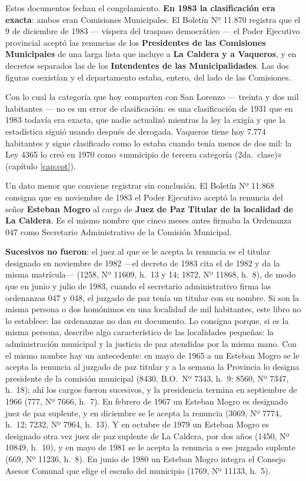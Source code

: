 Estos documentos fechan el congelamiento. \textbf{En 1983 la clasificación era exacta}: ambos eran Comisiones Municipales. El Boletín Nº 11.870 registra que el 9 de diciembre de 1983 --- víspera del traspaso democrático --- el Poder Ejecutivo provincial aceptó las renuncias de los \textbf{Presidentes de las Comisiones Municipales} de una larga lista que incluye a \textbf{La Caldera y a Vaqueros}, y en decretos separados las de los \textbf{Intendentes de las Municipalidades}. Las dos figuras coexistían y el departamento estaba, entero, del lado de las Comisiones.

Con lo cual la categoría que hoy comparten con San Lorenzo --- treinta y dos mil habitantes --- no es un error de clasificación: es una clasificación de 1931 que en 1983 todavía era exacta, que nadie actualizó mientras la ley la exigía y que la estadística siguió usando después de derogada. Vaqueros tiene hoy 7.774 habitantes y sigue clasificado como lo estaba cuando tenía menos de dos mil: la Ley 4365 lo creó en 1970 como «municipio de tercera categoría (2da.\ clase)» (capítulo \ref{cap:cot}).

\begin{cautela}
Un dato menor que conviene registrar sin conclusión. El Boletín Nº 11.868 consigna que en noviembre de 1983 el Poder Ejecutivo aceptó la renuncia del señor \textbf{Esteban Mogro} al cargo de \textbf{Juez de Paz Titular de la localidad de La Caldera}. Es el mismo nombre que cinco meses antes firmaba la Ordenanza 047 como Secretario Administrativo de la Comisión Municipal.

\textbf{Sucesivos no fueron}: el juez al que se le acepta la renuncia es el titular designado en noviembre de 1982 ---el decreto de 1983 cita el de 1982 y da la misma matrícula--- (1258, Nº 11609, h.\ 13 y 14; 1872, Nº 11868, h.\ 8), de modo que en junio y julio de 1983, cuando el secretario administrativo firma las ordenanzas 047 y 048, el juzgado de paz tenía un titular con su nombre. Si son la misma persona o dos homónimos en una localidad de mil habitantes, este libro no lo establece: las ordenanzas no dan su documento. Lo consigna porque, si es la misma persona, describe algo característico de las localidades pequeñas: la administración municipal y la justicia de paz atendidas por la misma mano. Con el mismo nombre hay un antecedente: en mayo de 1965 a un Esteban Mogro se le acepta la renuncia al juzgado de paz titular y a la semana la Provincia lo designa presidente de la comisión municipal (8430, B.O.\ Nº 7343, h.\ 9; 8560, Nº 7347, h.\ 18); ahí los cargos fueron sucesivos, y la presidencia termina en septiembre de 1966 (777, Nº 7666, h.\ 7). En febrero de 1967 un Esteban Mogro es designado juez de paz suplente, y en diciembre se le acepta la renuncia (3069, Nº 7774, h.\ 12; 7232, Nº 7964, h.\ 13). Y en octubre de 1979 un Esteban Mogro es designado otra vez juez de paz suplente de La Caldera, por dos años (1450, Nº 10849, h.\ 10), y en mayo de 1981 se le acepta la renuncia a ese juzgado suplente (669, Nº 11236, h.\ 8). En junio de 1980 un Esteban Mogro integra el Consejo Asesor Comunal que elige el escudo del municipio (1769, Nº 11133, h.\ 5).
\end{cautela}


